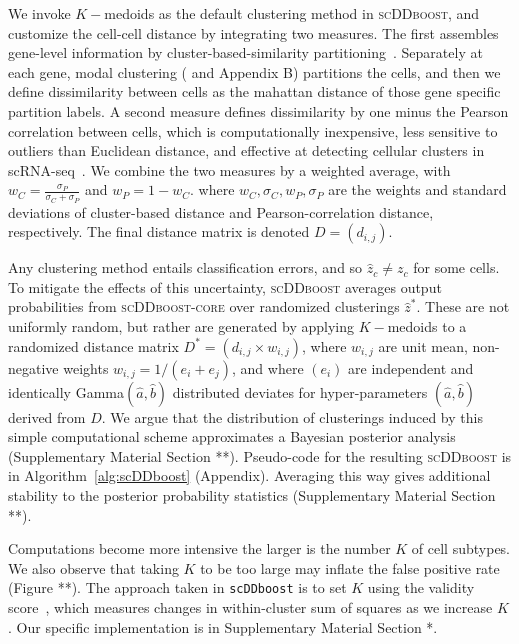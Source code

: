 \documentclass[aoas,preprint]{imsart}
\begin{document}
We invoke $K-$medoids \citep{kmedoids} 
as the default clustering method in \textsc{scDDboost}, and customize the cell-cell distance by integrating two measures.  
The first assembles gene-level information by cluster-based-similarity partitioning~\citep{ref:cspa}.
 Separately at each gene,   modal clustering (\cite{ref:dahl} and Appendix B) partitions the cells, and
then we define dissimilarity between cells as the mahattan distance of those gene specific partition labels.
A second measure defines dissimilarity by one minus the 
Pearson correlation between cells, which is computationally inexpensive,
less sensitive to outliers than Euclidean distance, and effective at detecting cellular clusters in 
scRNA-seq~\citep{Cor}.
 We combine the two measures by a weighted average, 
with  $w_C = \frac{\sigma_P}{\sigma_C + \sigma_P}$ and $w_P = 1 - w_C$. where $w_C,\sigma_C, w_P, \sigma_P$ are the weights and standard deviations of cluster-based distance and Pearson-correlation distance, respectively.
The final distance matrix is denoted $D=\left( d_{i,j} \right)$. 

Any clustering method  entails classification errors, and so $\hat z_c \neq z_c$ for some cells. To mitigate
the effects of this uncertainty, \textsc{scDDboost} averages output probabilities from \textsc{scDDboost-core} over
randomized clusterings $\hat z^*$.  These are not uniformly random, but rather are generated by applying $K-$medoids
to a randomized distance matrix $D^*=\left( d_{i,j}\times w_{i,j}\right)$, 
where $w_{i,j}$ are  unit mean, non-negative weights
$w_{i,j} = 1/( e_i + e_j )$, and where $( e_i) $ are independent and identically Gamma$(\hat a, \hat b)$ distributed
deviates for hyper-parameters $(\hat a, \hat b)$ derived from $D$.   We argue that the distribution of
clusterings induced by this simple computational 
scheme approximates a Bayesian posterior analysis (Supplementary Material
Section **).   Pseudo-code for the resulting \textsc{scDDboost} is in Algorithm~\ref{alg:scDDboost} (Appendix).
Averaging this way gives additional stability to the posterior probability statistics (Supplementary Material
Section **).


Computations become more intensive the larger is the number $K$ of cell subtypes. We also observe 
that  taking $K$ to be too large may inflate the false positive rate (Figure **).  The approach
taken in \verb+scDDboost+ is to set $K$ using the validity score~\citep{selK}, which measures 
changes in within-cluster sum of squares as we increase $K$.  Our specific implementation is in
Supplementary Material Section *.
\end{document}

